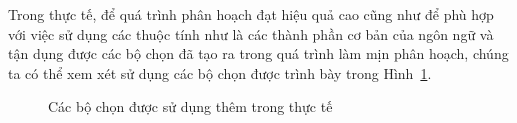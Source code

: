 Trong thực tế, để quá trình phân hoạch đạt hiệu quả cao cũng như để phù hợp với việc sử dụng các thuộc tính như là các thành phần cơ bản của ngôn ngữ và tận dụng được các bộ chọn đã tạo ra trong quá trình làm mịn phân hoạch, chúng ta có thể xem xét sử dụng các bộ chọn được trình bày trong Hình~\ref{fig:OtherSelectors}.
\begin{figure}
\caption{Các bộ chọn được sử dụng thêm trong thực tế\label{fig:OtherSelectors}}
\end{figure}

